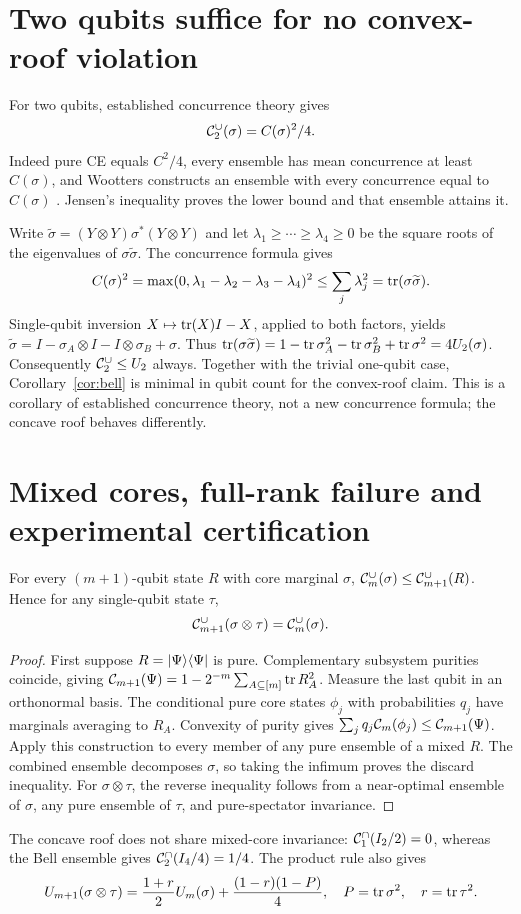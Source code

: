 \section{Two qubits suffice for no convex-roof violation}
For two qubits, established concurrence theory gives
\begin{equation}\label{eq:wootters}
\mathcal C_2^\cup(\sigma)=C(\sigma)^2/4.
\end{equation}
Indeed pure CE equals $C^2/4$, every ensemble has mean concurrence at least $C(\sigma)$, and Wootters constructs an ensemble with every concurrence equal to $C(\sigma)$ \cite{wootters1998}. Jensen's inequality proves the lower bound and that ensemble attains it.

Write $\widetilde\sigma=(Y\otimes Y)\sigma^*(Y\otimes Y)$ and let $\lambda_1\geq\cdots\geq\lambda_4\geq0$ be the square roots of the eigenvalues of $\sigma\widetilde\sigma$. The concurrence formula gives
\[
C(\sigma)^2=\max(0,\lambda_1-\lambda_2-\lambda_3-\lambda_4)^2
\leq\sum_j\lambda_j^2=\operatorname{tr}(\sigma\widetilde\sigma).
\]
Single-qubit inversion $X\mapsto\operatorname{tr}(X)I-X$, applied to both factors, yields
$\widetilde\sigma=I-\sigma_A\otimes I-I\otimes\sigma_B+\sigma$.
Thus $\operatorname{tr}(\sigma\widetilde\sigma)=1-\operatorname{tr}\sigma_A^2-\operatorname{tr}\sigma_B^2+\operatorname{tr}\sigma^2=4U_2(\sigma)$.
Consequently $\mathcal C_2^\cup\leq U_2$ always. Together with the trivial one-qubit case, Corollary~\ref{cor:bell} is minimal in qubit count for the convex-roof claim. This is a corollary of established concurrence theory, not a new concurrence formula; the concave roof behaves differently.

\section{Mixed cores, full-rank failure and experimental certification}
\begin{lemma}\label{lem:discard}
For every $(m+1)$-qubit state $R$ with core marginal $\sigma$, $\mathcal C_m^\cup(\sigma)\leq\mathcal C_{m+1}^\cup(R)$. Hence for any single-qubit state $\tau$,
\[
\mathcal C_{m+1}^\cup(\sigma\otimes\tau)=\mathcal C_m^\cup(\sigma).
\]
\end{lemma}
\begin{proof}
First suppose $R=\lvert \Psi\rangle\langle \Psi\rvert$ is pure. Complementary subsystem purities coincide, giving
$\mathcal C_{m+1}(\Psi)=1-2^{-m}\sum_{A\subseteq[m]}\operatorname{tr} R_A^2$.
Measure the last qubit in an orthonormal basis. The conditional pure core states $\phi_j$ with probabilities $q_j$ have marginals averaging to $R_A$. Convexity of purity gives $\sum_jq_j\mathcal C_m(\phi_j)\leq\mathcal C_{m+1}(\Psi)$. Apply this construction to every member of any pure ensemble of a mixed $R$. The combined ensemble decomposes $\sigma$, so taking the infimum proves the discard inequality. For $\sigma\otimes\tau$, the reverse inequality follows from a near-optimal ensemble of $\sigma$, any pure ensemble of $\tau$, and pure-spectator invariance.
\end{proof}
The concave roof does not share mixed-core invariance: $\mathcal C_1^\cap(I_2/2)=0$, whereas the Bell ensemble gives $\mathcal C_2^\cap(I_4/4)=1/4$. The product rule also gives
\[
U_{m+1}(\sigma\otimes\tau)=\frac{1+r}{2}U_m(\sigma)+\frac{(1-r)(1-P)}4,
\quad P=\operatorname{tr}\sigma^2,\quad r=\operatorname{tr}\tau^2.
\]

